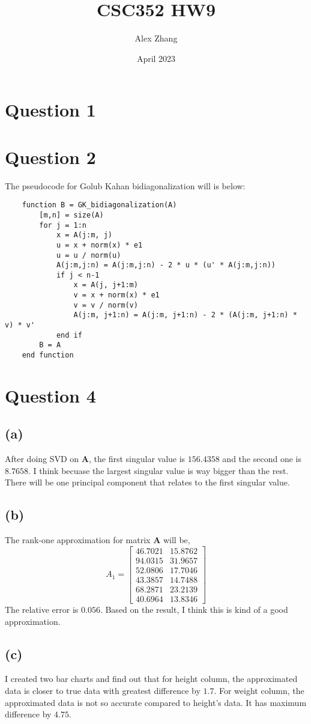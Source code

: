 \documentclass{article}
\title{CSC352 HW9}
\author{Alex Zhang}
\date{April 2023}
\newcommand{\bmat}[1]{\begin{bmatrix} #1 \end{bmatrix}}
\newcommand{\mat}[1]{\mathbf{#1}}
\begin{document}
\maketitle
\section*{Question 1}

\section*{Question 2}
The pseudocode for Golub Kahan bidiagonalization will is below:

\begin{verbatim}
    function B = GK_bidiagonalization(A)
        [m,n] = size(A)
        for j = 1:n
            x = A(j:m, j)
            u = x + norm(x) * e1
            u = u / norm(u)
            A(j:m,j:n) = A(j:m,j:n) - 2 * u * (u' * A(j:m,j:n))
            if j < n-1
                x = A(j, j+1:m)
                v = x + norm(x) * e1
                v = v / norm(v)
                A(j:m, j+1:n) = A(j:m, j+1:n) - 2 * (A(j:m, j+1:n) * v) * v'
            end if    
        B = A
    end function
\end{verbatim}

\section*{Question 4}
\subsection*{(a)}
After doing SVD on $\mat{A}$, the first singular value is $156.4358$ and the second one is $8.7658$. I think 
becuase the largest singular value is way bigger than the rest. There will be
one principal component that relates to the first singular value.
\subsection*{(b)}

The rank-one approximation for matrix $\mat{A}$ will be, 
$$A_1 = \bmat{ 46.7021 &  15.8762\\
94.0315 &  31.9657 \\
52.0806  & 17.7046\\
43.3857  & 14.7488\\
68.2871  & 23.2139\\
40.6964  & 13.8346}$$
The relative error is $0.056$. Based on the result, I think this is kind of a good
approximation.

\subsection*{(c)}
I created two bar charts and find out that for height column, the approximated 
data is closer to true data with greatest difference by $1.7$. For weight column,
the approximated data is not so accurate compared to height's data. It has maximum difference 
by $4.75$.
\end{document}
